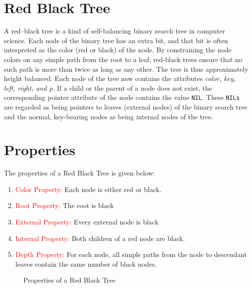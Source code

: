 \documentclass{article}[10pt]
\begin{document}
\section{Red Black Tree}
A red–black tree is a kind of self-balancing binary search tree in computer science. Each node of the binary tree has an extra bit, and that bit is often interpreted as the color (red or black) of the node. 
By constraining the node colors on any simple path from the root to a leaf, red-black trees ensure that no such path is more than twice as long as any other. 
The tree is thus approximately height balanced.
Each node of the tree now contains the attributes
\textit{color, key, left, right, and p.} If
a child or the parent of a node does not exist, the corresponding pointer attribute of the node contains the value \texttt{NIL}. These \texttt{NILs} are regarded as being pointers to leaves (external nodes) of the binary search tree and the normal, key-bearing nodes as being internal nodes of the tree.


\section{Properties}

            The properties\cite{introAlgo} of a Red Black Tree is given below:
            \begin{enumerate}
                
                \item \textcolor{red}{Color Property:} Each node is either red or black.
                \item \textcolor{red}{Root Property:} The root is black
                \item \textcolor{red}{External Property:} Every external node is black
                \item \textcolor{red}{Internal Property:} Both children of a red node are black.
                \item \textcolor{red}{Depth Property:} For each node, all simple paths from the node to descendant leaves contain the same number of black nodes.
            \end{enumerate}

        
       \begin{figure}[h]
            
           \centering
            
           \caption{Properties of a Red Black Tree}
           \label{fig:Properties of RBT}
       \end{figure}
    
\end{document}
